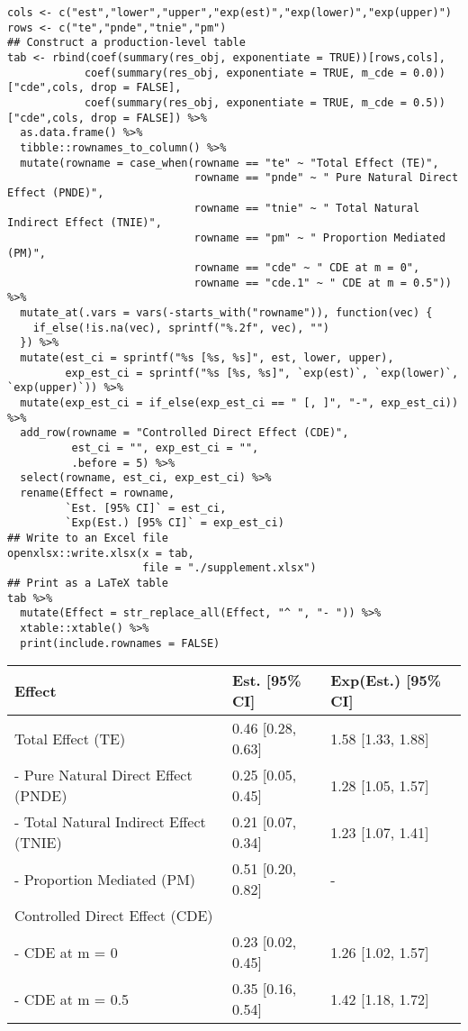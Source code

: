 \documentclass[10pt]{article}
\begin{document}
\scriptsize
\begin{verbatim}
cols <- c("est","lower","upper","exp(est)","exp(lower)","exp(upper)")
rows <- c("te","pnde","tnie","pm")
## Construct a production-level table
tab <- rbind(coef(summary(res_obj, exponentiate = TRUE))[rows,cols],
            coef(summary(res_obj, exponentiate = TRUE, m_cde = 0.0))["cde",cols, drop = FALSE],
            coef(summary(res_obj, exponentiate = TRUE, m_cde = 0.5))["cde",cols, drop = FALSE]) %>%
  as.data.frame() %>%
  tibble::rownames_to_column() %>%
  mutate(rowname = case_when(rowname == "te" ~ "Total Effect (TE)",
                             rowname == "pnde" ~ " Pure Natural Direct Effect (PNDE)",
                             rowname == "tnie" ~ " Total Natural Indirect Effect (TNIE)",
                             rowname == "pm" ~ " Proportion Mediated (PM)",
                             rowname == "cde" ~ " CDE at m = 0",
                             rowname == "cde.1" ~ " CDE at m = 0.5")) %>%
  mutate_at(.vars = vars(-starts_with("rowname")), function(vec) {
    if_else(!is.na(vec), sprintf("%.2f", vec), "")
  }) %>%
  mutate(est_ci = sprintf("%s [%s, %s]", est, lower, upper),
         exp_est_ci = sprintf("%s [%s, %s]", `exp(est)`, `exp(lower)`, `exp(upper)`)) %>%
  mutate(exp_est_ci = if_else(exp_est_ci == " [, ]", "-", exp_est_ci)) %>%
  add_row(rowname = "Controlled Direct Effect (CDE)",
          est_ci = "", exp_est_ci = "",
          .before = 5) %>%
  select(rowname, est_ci, exp_est_ci) %>%
  rename(Effect = rowname,
         `Est. [95% CI]` = est_ci,
         `Exp(Est.) [95% CI]` = exp_est_ci)
## Write to an Excel file
openxlsx::write.xlsx(x = tab,
                     file = "./supplement.xlsx")
## Print as a LaTeX table
tab %>%
  mutate(Effect = str_replace_all(Effect, "^ ", "- ")) %>%
  xtable::xtable() %>%
  print(include.rownames = FALSE)
\end{verbatim}

\begin{table}[ht]
\centering
\begin{tabular}{lll}
  \hline
Effect & Est. [95\% CI] & Exp(Est.) [95\% CI] \\ 
  \hline
Total Effect (TE) & 0.46 [0.28, 0.63] & 1.58 [1.33, 1.88] \\ 
  - Pure Natural Direct Effect (PNDE) & 0.25 [0.05, 0.45] & 1.28 [1.05, 1.57] \\ 
  - Total Natural Indirect Effect (TNIE) & 0.21 [0.07, 0.34] & 1.23 [1.07, 1.41] \\ 
  - Proportion Mediated (PM) & 0.51 [0.20, 0.82] & - \\ 
  Controlled Direct Effect (CDE) &  &  \\ 
  - CDE at m = 0 & 0.23 [0.02, 0.45] & 1.26 [1.02, 1.57] \\ 
  - CDE at m = 0.5 & 0.35 [0.16, 0.54] & 1.42 [1.18, 1.72] \\ 
   \hline
\end{tabular}
\end{table}
\end{document}
